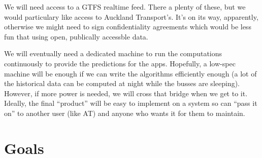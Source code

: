 \documentclass[12pt,a4paper]{article}
\begin{document}
We will need access to a GTFS realtime feed.
There a plenty of these, but we would particulary like access to Auckland Transport's.
It's on its way, apparently, otherwise we might need to sign confidentiality agreements which would be less 
fun that using open, publically accessble data.


We will eventually need a dedicated machine to run the computations continuously to provide the predictions
for the apps.
Hopefully, a low-spec machine will be enough if we can write the algorithms efficiently enough 
(a lot of the historical data can be computed at night while the busses are sleeping).
However, if more power is needed, we will cross that bridge when we get to it.
Ideally, the final ``product'' will be easy to implement on a system so can ``pass it on''
to another user (like AT) and anyone who wants it for them to maintain.





\section{Goals}











\end{document}
